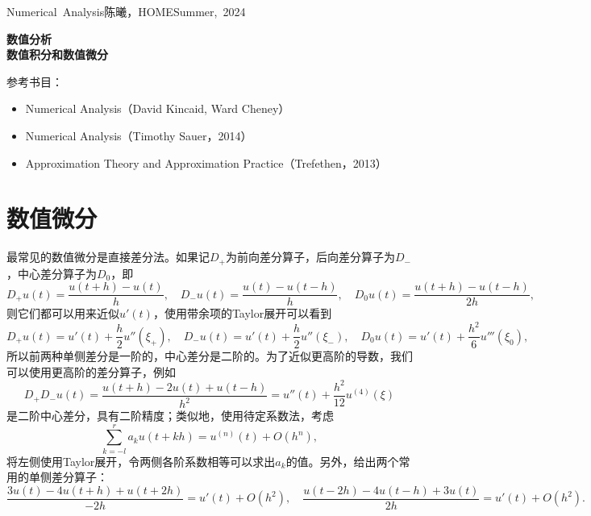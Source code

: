 \documentclass[a4paper,10pt]{ctexart}
\begin{document}
\hfill\vbox{\hbox{Numerical Analysis}\hbox{陈曦，HOME}\hbox{Summer, 2024}}

\begin{center}\Large
    \textbf{数值分析}\\{\normalsize\bf {数值积分和数值微分}}
\end{center}
\vskip 30pt
\small {参考书目：
\begin{itemize}
    \item Numerical Analysis（David Kincaid, Ward Cheney）
    \item Numerical Analysis（Timothy Sauer，2014）
    \item Approximation Theory and Approximation Practice（Trefethen，2013）
\end{itemize}}
\vskip 30pt

\section{数值微分}
最常见的数值微分是直接差分法。如果记$ D_+ $为前向差分算子，后向差分算子为$ D_- $，中心差分算子为$ D_0 $，即
\[
    D_+u(t) = \frac{u(t+h)-u(t)}{h},\quad D_-u(t) = \frac{u(t)-u(t-h)}{h},\quad D_0u(t) = \frac{u(t+h)-u(t-h)}{2h},
\]
则它们都可以用来近似$ u'(t) $，使用带余项的Taylor展开可以看到
\[
    D_+ u(t) = u'(t) + \frac{h}{2}u''(\xi_+) ,\quad D_- u(t) = u'(t) + \frac{h}{2}u''(\xi_-),\quad D_0 u(t) = u'(t) + \frac{h^2}{6}u'''(\xi_0),
\]
所以前两种单侧差分是一阶的，中心差分是二阶的。为了近似更高阶的导数，我们可以使用更高阶的差分算子，例如
\[
    D_+D_-u(t) = \frac{u(t+h)-2u(t)+u(t-h)}{h^2} = u''(t) + \frac{h^2}{12}u^{(4)}(\xi)
\]
是二阶中心差分，具有二阶精度；类似地，使用待定系数法，考虑
\[
    \sum_{k=-l}^r a_k u(t+kh) = u^{(n)}(t) + O(h^n),
\]
将左侧使用Taylor展开，令两侧各阶系数相等可以求出$ a_k $的值。另外，给出两个常用的单侧差分算子：
\[
    \frac{3u(t)-4u(t+h)+u(t+2h)}{-2h} = u'(t) + O(h^2),\quad \frac{u(t-2h)-4u(t-h)+3u(t)}{2h} = u'(t) + O(h^2).
\]
\end{document}
